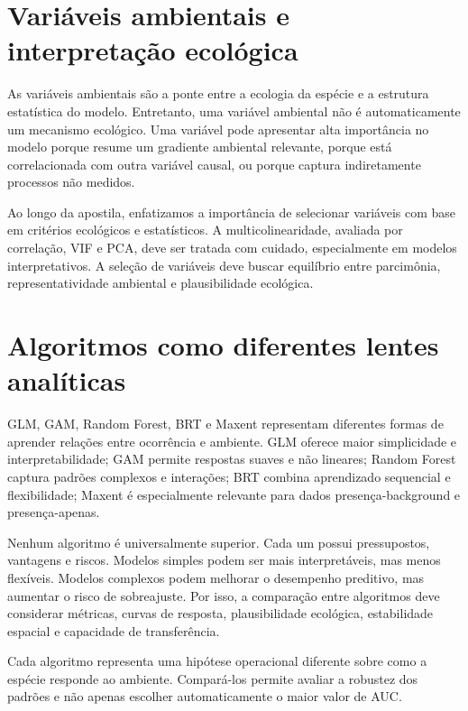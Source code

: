\section{Variáveis ambientais e interpretação ecológica}

As variáveis ambientais são a ponte entre a ecologia da espécie e a estrutura estatística do modelo. Entretanto, uma variável ambiental não é automaticamente um mecanismo ecológico. Uma variável pode apresentar alta importância no modelo porque resume um gradiente ambiental relevante, porque está correlacionada com outra variável causal, ou porque captura indiretamente processos não medidos.

Ao longo da apostila, enfatizamos a importância de selecionar variáveis com base em critérios ecológicos e estatísticos. A multicolinearidade, avaliada por correlação, VIF e PCA, deve ser tratada com cuidado, especialmente em modelos interpretativos. A seleção de variáveis deve buscar equilíbrio entre parcimônia, representatividade ambiental e plausibilidade ecológica.

\section{Algoritmos como diferentes lentes analíticas}

GLM, GAM, Random Forest, BRT e Maxent representam diferentes formas de aprender relações entre ocorrência e ambiente. GLM oferece maior simplicidade e interpretabilidade; GAM permite respostas suaves e não lineares; Random Forest captura padrões complexos e interações; BRT combina aprendizado sequencial e flexibilidade; Maxent é especialmente relevante para dados presença-background e presença-apenas.

Nenhum algoritmo é universalmente superior. Cada um possui pressupostos, vantagens e riscos. Modelos simples podem ser mais interpretáveis, mas menos flexíveis. Modelos complexos podem melhorar o desempenho preditivo, mas aumentar o risco de sobreajuste. Por isso, a comparação entre algoritmos deve considerar métricas, curvas de resposta, plausibilidade ecológica, estabilidade espacial e capacidade de transferência.

\begin{conceito}[title={\faBook\quad Algoritmos são hipóteses operacionais}]
	Cada algoritmo representa uma hipótese operacional diferente sobre como a espécie responde ao ambiente. Compará-los permite avaliar a robustez dos padrões e não apenas escolher automaticamente o maior valor de AUC.
\end{conceito}

